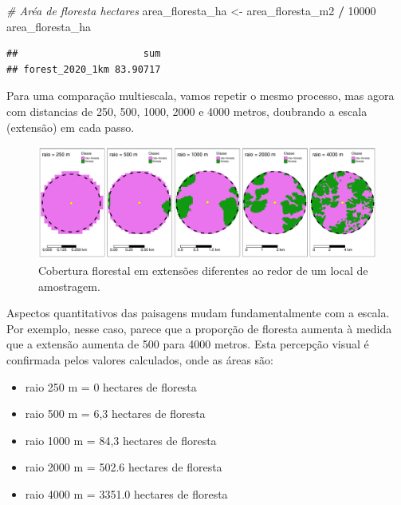 \documentclass[
]{article}
\newenvironment{Shaded}{\begin{snugshade}}{\end{snugshade}}
\newcommand{\CommentTok}[1]{\textcolor[rgb]{0.56,0.35,0.01}{\textit{#1}}}
\newcommand{\DecValTok}[1]{\textcolor[rgb]{0.00,0.00,0.81}{#1}}
\newcommand{\NormalTok}[1]{#1}
\newcommand{\OtherTok}[1]{\textcolor[rgb]{0.56,0.35,0.01}{#1}}
\newcommand{\SpecialCharTok}[1]{\textcolor[rgb]{0.81,0.36,0.00}{\textbf{#1}}}
\providecommand{\tightlist}{%
  \setlength{\itemsep}{0pt}\setlength{\parskip}{0pt}}
\begin{document}
\begin{Shaded}
\begin{Highlighting}[]
\CommentTok{\# Aréa de floresta hectares}
\NormalTok{area\_floresta\_ha }\OtherTok{\textless{}{-}}\NormalTok{ area\_floresta\_m2 }\SpecialCharTok{/} \DecValTok{10000}
\NormalTok{area\_floresta\_ha}
\end{Highlighting}
\end{Shaded}

\begin{verbatim}
##                      sum
## forest_2020_1km 83.90717
\end{verbatim}

\newpage

Para uma comparação multiescala, vamos repetir o mesmo processo, mas agora com distancias de 250, 500, 1000, 2000 e 4000 metros, doubrando a escala (extensão) em cada passo.

\begin{figure}
\centering
\includegraphics{epr_files/figure-latex/mapa-exte-pontos-1.pdf}
\caption{\label{fig:mapa-exte-pontos}Cobertura florestal em extensões diferentes ao redor de um local de amostragem.}
\end{figure}

Aspectos quantitativos das paisagens mudam fundamentalmente com a escala. Por exemplo, nesse caso, parece que a proporção de floresta aumenta à medida que a extensão aumenta de 500 para 4000 metros. Esta percepção visual é confirmada pelos valores calculados, onde as áreas são:

\begin{itemize}
\tightlist
\item
  raio 250 m = 0 hectares de floresta
\item
  raio 500 m = 6,3 hectares de floresta
\item
  raio 1000 m = 84,3 hectares de floresta
\item
  raio 2000 m = 502.6 hectares de floresta
\item
  raio 4000 m = 3351.0 hectares de floresta
\end{itemize}
\end{document}
